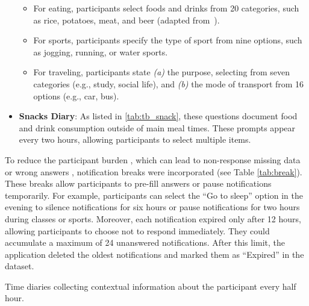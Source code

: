\begin{itemize}
\begin{itemize}
    \item For eating, participants select foods and drinks from 20 categories, such as rice, potatoes, meat, and beer (adapted from~\cite{gatica19}).
    \item For sports, participants specify the type of sport from nine options, such as jogging, running, or water sports.
    \item For traveling, participants state \textit{(a)} the purpose, selecting from seven categories (e.g., study, social life), and \textit{(b)} the mode of transport from 16 options (e.g., car, bus).
\end{itemize}
%
\item \textbf{Snacks Diary}: As listed in \cref{tab:tb_snack}, these questions document food and drink consumption outside of main meal times. These prompts appear every two hours, allowing participants to select multiple items.
\end{itemize}
\noindent
To reduce the participant burden \cite{ROLSTAD20111101, eisele2022effects}, which can lead to non-response missing data or wrong answers \cite{bison2024impacts}, notification breaks were incorporated (see Table \ref{tab:break}). These breaks allow participants to pre-fill answers or pause notifications temporarily. For example, participants can select the “Go to sleep” option in the evening to silence notifications for six hours or pause notifications for two hours during classes or sports.
Moreover, each notification expired only after 12 hours, allowing participants to choose not to respond immediately. They could accumulate a maximum of 24 unanswered notifications. After this limit, the application deleted the oldest notifications and marked them as ``Expired'' in the dataset.

\begin{table}[]
    \footnotesize
    \centering
    \caption{Time diaries collecting contextual information about the participant every half hour.}
    \label{tab:td_main}
    
\end{table}

